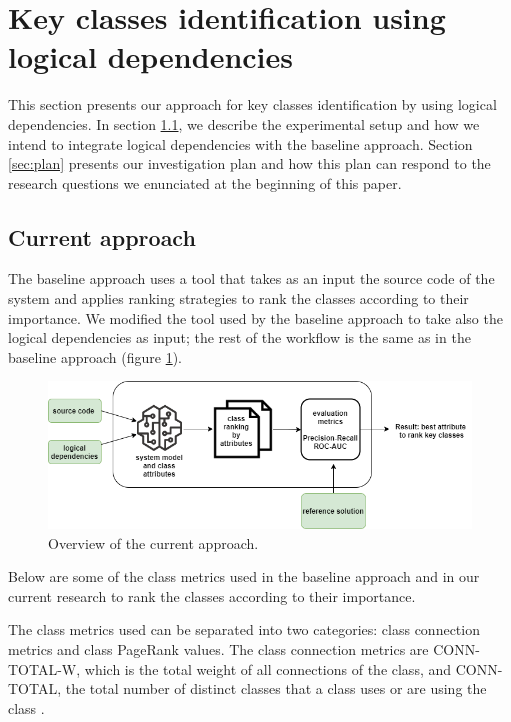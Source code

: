 \documentclass[runningheads]{comsis2}
\begin{document}
\section{Key classes identification using logical dependencies}
\label{sec:keycalss_identification}
This section presents our approach for key classes identification by using logical dependencies. 
In section \ref{sec:current_approach}, we describe the experimental setup and how we intend to integrate logical dependencies with the baseline approach. 
Section \ref{sec:plan} presents our investigation plan and how this plan can respond to the research questions we enunciated at the beginning of this paper.

\subsection{Current approach}
\label{sec:current_approach}
The baseline approach uses a tool that takes as an input the source code of the system and applies ranking strategies to rank the classes according to their importance. We modified the tool used by the baseline approach to take also the logical dependencies as input; the rest of the workflow is the same as in the baseline approach (figure \ref{fig:baseline_approach}).

\begin{figure}
\centering
\includegraphics[width=\textwidth]{current_approach.PNG}
\caption{Overview of the current approach.}
\label{fig:baseline_approach}
\centering
\end{figure}
Below are some of the class metrics used in the baseline approach and in our current research to rank the classes according to their importance. 

The class metrics used can be separated into two categories: class connection metrics and class PageRank values.
The class connection metrics are CONN-TOTAL-W, which is the total weight of all connections of the class, and CONN-TOTAL, the total number of distinct classes that a class uses or are using the class \cite{Finding-key-classes}.
\end{document}
